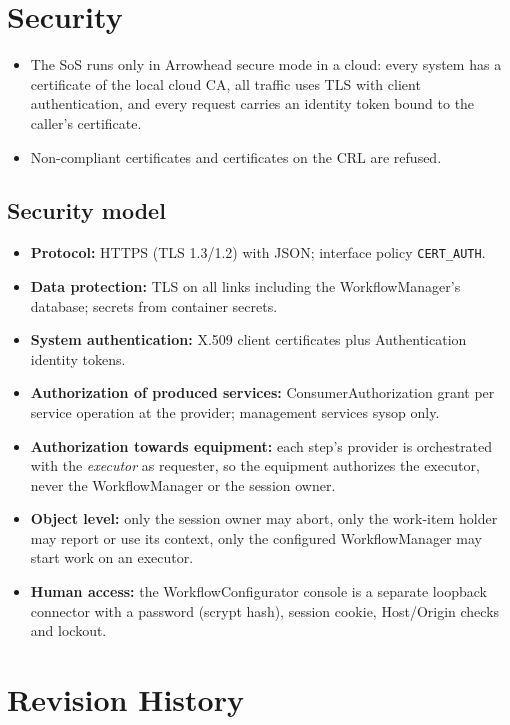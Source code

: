 \documentclass[a4paper]{arrowhead}
\begin{document}
\newpage
\section{Security}
\label{sec:security}
\begin{itemize}
\item The SoS runs only in Arrowhead secure mode in a cloud: every system has a certificate of the local cloud CA, all
traffic uses TLS with client authentication, and every request carries an identity token bound to the caller's
certificate.
\item Non-compliant certificates and certificates on the CRL are refused.
\end{itemize}
\subsection{Security model}
\begin{itemize}
\item \textbf{Protocol:} HTTPS (TLS 1.3/1.2) with JSON; interface policy \texttt{CERT\_AUTH}.
\item \textbf{Data protection:} TLS on all links including the WorkflowManager's database; secrets from container secrets.
\item \textbf{System authentication:} X.509 client certificates plus Authentication identity tokens.
\item \textbf{Authorization of produced services:} ConsumerAuthorization grant per service operation at the provider;
management services sysop only.
\item \textbf{Authorization towards equipment:} each step's provider is orchestrated with the \emph{executor} as
requester, so the equipment authorizes the executor, never the WorkflowManager or the session owner.
\item \textbf{Object level:} only the session owner may abort, only the work-item holder may report or use its context,
only the configured WorkflowManager may start work on an executor.
\item \textbf{Human access:} the WorkflowConfigurator console is a separate loopback connector with a password (scrypt
hash), session cookie, Host/Origin checks and lockout.
\end{itemize}

\newpage



\newpage

\section{Revision History}
\end{document}
